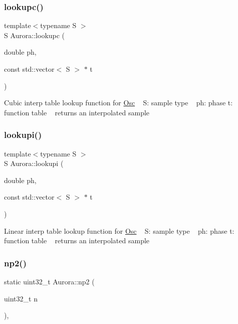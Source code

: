 \subsubsection{\texorpdfstring{lookupc()}{lookupc()}}
{\footnotesize\ttfamily template$<$typename S $>$ \\
S Aurora\+::lookupc (\begin{DoxyParamCaption}\item[{double}]{ph,  }\item[{const std\+::vector$<$ S $>$ $\ast$}]{t }\end{DoxyParamCaption})\hspace{0.3cm}{\ttfamily [inline]}}

Cubic interp table lookup function for \hyperlink{class_aurora_1_1_osc}{Osc} ~\newline
S\+: sample type ~\newline
ph\+: phase  t\+: function table ~\newline
returns an interpolated sample \mbox{\label{namespace_aurora_a9246ac499667da52a0d1750e5238c4a8}} 
\subsubsection{\texorpdfstring{lookupi()}{lookupi()}}
{\footnotesize\ttfamily template$<$typename S $>$ \\
S Aurora\+::lookupi (\begin{DoxyParamCaption}\item[{double}]{ph,  }\item[{const std\+::vector$<$ S $>$ $\ast$}]{t }\end{DoxyParamCaption})\hspace{0.3cm}{\ttfamily [inline]}}

Linear interp table lookup function for \hyperlink{class_aurora_1_1_osc}{Osc} ~\newline
S\+: sample type ~\newline
ph\+: phase  t\+: function table ~\newline
returns an interpolated sample \mbox{\label{namespace_aurora_a49b6f6d92479d80271ced42627154066}} 
\subsubsection{\texorpdfstring{np2()}{np2()}}
{\footnotesize\ttfamily static uint32\+\_\+t Aurora\+::np2 (\begin{DoxyParamCaption}\item[{uint32\+\_\+t}]{n }\end{DoxyParamCaption})\hspace{0.3cm}{\ttfamily [inline]}, {\ttfamily [static]}}

